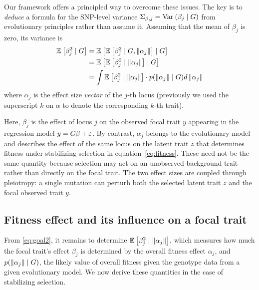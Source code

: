 \documentclass[10pt]{article}
\begin{document}
Our framework offers a principled way to overcome these issues.
The key is to \emph{deduce} a formula for the SNP-level variance $\Sigma_{\beta,j} = \mathrm{Var}_{}\left(\beta_j \mid G\right)$ from evolutionary principles rather than assume it.
Assuming that the mean of $\beta_j$ is zero, its variance is
\begin{equation}
    \label{eq:goal2}
\begin{aligned} 
    \mathbb{E}_{}\left[\beta_j^2 \mid G\right] &= \mathbb{E}_{}\left[\mathbb{E}_{}\left[\beta_j^2 \mid G, \left\| \alpha_j \right\|\right] \mid G\right]\\
    &= \mathbb{E}_{}\left[\mathbb{E}_{}\left[\beta_j^2 \mid \left\| \alpha_j \right\|\right] \mid G\right]\\
    &= \int \mathbb{E}_{}\left[\beta_j^2 \mid \left\| \alpha_j \right\|\right] \cdot p(\left\| \alpha_j \right\| \mid G) d\left\| \alpha_j \right\|
\end{aligned}
\end{equation}
where $\alpha_j$ is the effect size \emph{vector} of the $j$-th locus (previously we used the superscript $k$ on $\alpha$ to denote the corresponding $k$-th trait).

Here, $\beta_j$ is the effect of locus $j$ on the observed focal trait $y$ appearing in the regression model $y = G\beta + {{\varepsilon}}$.
By contrast, $\alpha_j$ belongs to the evolutionary model and describes the effect of the same locus on the latent trait $z$  that determines fitness under stabilizing selection in equation~\eqref{eq:fitness}.
These need not be the same quantity because selection may act on an unobserved background trait rather than directly on the focal trait.
The two effect sizes are coupled through pleiotropy: a single mutation can perturb both the selected latent trait $z$ and the focal observed trait $y$. 

\subsection{Fitness effect and its influence on a focal trait}
From \eqref{eq:goal2}, it remains to determine $\mathbb{E}_{}\left[\beta_j^2 \mid \left\| \alpha_j \right\|\right]$, which measures how much the focal trait's effect $\beta_j$ is determined by the overall fitness effect $\alpha_j$,
and $p(\left\| \alpha_j \right\| \mid G)$, the likely value of overall fitness given the genotype data
from a given evolutionary model. We now derive these quantities in the case of stabilizing selection. 
\end{document}
